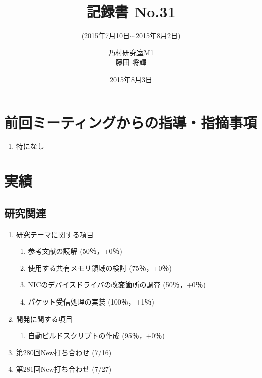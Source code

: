 \documentclass[fleqn, 14pt]{extarticle}
\subtitle{(2015年7月10日$\sim$2015年8月2日)}
\author{乃村研究室M1\\藤田 将輝}
\date{2015年8月3日}
\title{記録書 No.31}
\begin{document}
\maketitle
\section{前回ミーティングからの指導・指摘事項}
\label{sec-1}
\begin{enumerate}
\item 特になし
\newline
\hfill

\end{enumerate}

\section{実績}
\label{sec-2}

\subsection{研究関連}
\label{sec-2-1}
\begin{enumerate}
    \item 研究テーマに関する項目
    \hfill
    \label{enum-research1}
    \begin{enumerate}

        \item 参考文献の読解
        \hfill
        \label{enum-1-A}
        (50％，+0％)
        \item 使用する共有メモリ領域の検討
        \hfill
        \label{enum-1-B}
        (75％，+0％)
        \item NICのデバイスドライバの改変箇所の調査
        \hfill
        \label{enum-1-C}
        (50％，+0％)
        \item パケット受信処理の実装
        \hfill
        \label{enum-1-D}
        (100％，+1％)

    \end{enumerate}
    \item 開発に関する項目
    \hfill
    \label{enum-research2}
    \begin{enumerate}

        \item 自動ビルドスクリプトの作成
        \hfill
        \label{enum-2-A}
        (95％，+0％)
    \end{enumerate}

    \item 第280回New打ち合わせ
    \hfill
    \label{enum-research3}
    (7/16)
    \item 第281回New打ち合わせ 
    \hfill
    \label{enum-research3}
    (7/27)
    \end{enumerate}
\end{document}
